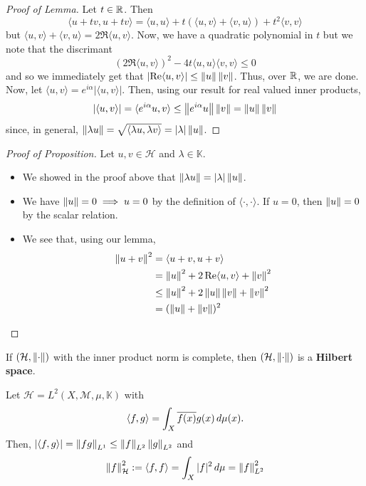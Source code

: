 \documentclass[11pt,leqno,oneside]{amsbook}
\numberwithin{thm}{section}
\newcommand{\M}{\mathcal{M}} %
\newcommand{\K}{\mathbb{K}} %
\renewcommand{\H}{\mathcal{H}} %
\renewcommand{\de}{\textbf} %
\begin{document}
\begin{proof}[Proof of Lemma]
  Let \(t \in \R\). Then \[
    \langle u+tv, u+tv \rangle = \langle u,u \rangle + t (\langle u,v
    \rangle + \langle v,u \rangle) + t^2 \langle v,v \rangle
  \]
  but \(\langle u,v \rangle + \langle v,u \rangle = 2 \Re \langle u,v
  \rangle\). Now, we have a quadratic polynomial in \(t\) but we note
  that the discrimant \[
    (2 \Re \langle u,v \rangle)^2 - 4 t \langle u,u \rangle\langle v,v \rangle
    \leq 0
  \]
  and so we immediately get that \(\left| \Re \langle u,v \rangle
  \right| \leq \norm[u] \norm[v]\). Thus, over \(\R\), we are
  done. Now, let \(\langle u,v \rangle = e^{i \alpha} |\langle u,v
  \rangle|\). Then, using our result for real valued inner products, \[
    \left| \langle u,v \rangle \right| = \langle  e^{i\alpha} u,v
    \rangle \leq \norm[e^{i \alpha} u] \norm[v] = \norm[u] \norm[v]
  \]
  since, in general, \(\norm[\lambda u] = \sqrt{\langle \lambda u,
    \lambda v \rangle} = |\lambda|\norm[u]\).
\end{proof}
\begin{proof}[Proof of Proposition]
  Let \(u,v \in \H\) and \(\lambda \in \K\).
  \begin{itemize}
  \item We showed in the proof above that \(\norm[\lambda u] =
    |\lambda|\norm[u]\).
  \item We have \(\norm[u] = 0 \implies u = 0\) by the definition of
    \(\langle \cdot,\cdot \rangle\). If \(u = 0\), then \(\norm[u] =
    0\) by the scalar relation.
  \item We see that, using our lemma,
    \begin{align*}
      \norm[u+v]^2 & = \langle u+v,u+v \rangle \\
                   & = \norm[u]^2 + 2 \Re \langle u,v \rangle + \norm[v]^2 \\
                   & \leq \norm[u]^2 + 2 \norm[u] \norm[v] + \norm[v]^2 \\
      & = (\norm[u] + \norm[v])^2
    \end{align*}
  \end{itemize}
\end{proof}
\begin{defn}
  If \((\H,\norm)\) with the inner product norm is complete, then
  \((\H,\norm)\) is a \de{Hilbert space}.
\end{defn}
\begin{example}
  Let \(\H = L^2(X,\M,\mu,\K)\) with \[
    \langle f,g \rangle = \int_X \ov{f(x)} g(x) \d \mu(x).
  \]
  Then, \(|\langle  f,g \rangle| = \norm[fg]_{L^1} \leq \norm[f]_{L^2}
  \norm[g]_{L^2}\) and \[
    \norm[f]_\H^2 := \langle  f,f \rangle = \int_X |f|^2 \d \mu = \norm[f]_{L^2}^2
  \]
\end{example}
\end{document}
